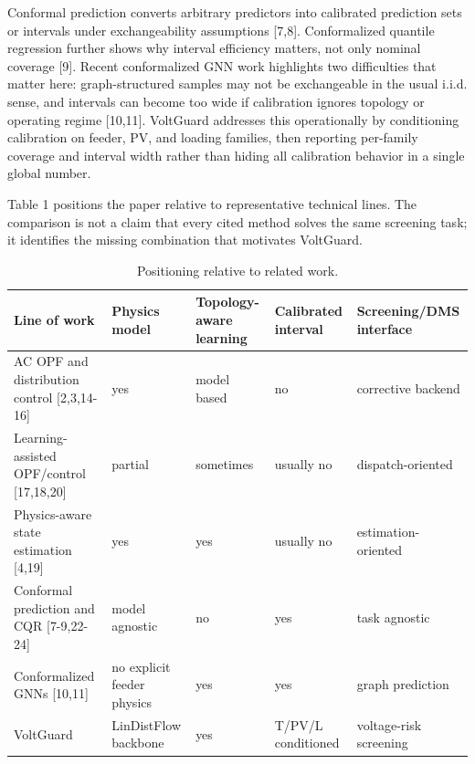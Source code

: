 \documentclass[
  preprint,12pt]{elsarticle}
\begin{document}
Conformal prediction converts arbitrary predictors into calibrated
prediction sets or intervals under exchangeability assumptions
{[}7,8{]}. Conformalized quantile regression further shows why interval
efficiency matters, not only nominal coverage {[}9{]}. Recent
conformalized GNN work highlights two difficulties that matter here:
graph-structured samples may not be exchangeable in the usual i.i.d.
sense, and intervals can become too wide if calibration ignores topology
or operating regime {[}10,11{]}. VoltGuard addresses this operationally
by conditioning calibration on feeder, PV, and loading families, then
reporting per-family coverage and interval width rather than hiding all
calibration behavior in a single global number.

Table 1 positions the paper relative to representative technical lines.
The comparison is not a claim that every cited method solves the same
screening task; it identifies the missing combination that motivates
VoltGuard.

\begin{longtable}[]{@{}
  >{\centering\hyphenpenalty=10000\exhyphenpenalty=10000\arraybackslash}m{}
  >{\centering\hyphenpenalty=10000\exhyphenpenalty=10000\arraybackslash}m{}
  >{\centering\hyphenpenalty=10000\exhyphenpenalty=10000\arraybackslash}m{}
  >{\centering\hyphenpenalty=10000\exhyphenpenalty=10000\arraybackslash}m{}
  >{\centering\hyphenpenalty=10000\exhyphenpenalty=10000\arraybackslash}m{}@{}}
\caption{Positioning relative to related work.}\\\toprule\noalign{}
Line of work & Physics model & Topology-aware learning & Calibrated interval & Screening/DMS interface \\
\midrule\noalign{}
\endhead
\bottomrule\noalign{}
\endlastfoot
AC OPF and distribution control {[}2,3,14-16{]} & yes & model based & no
& corrective backend \\
Learning-assisted OPF/control {[}17,18,20{]} & partial & sometimes &
usually no & dispatch-oriented \\
Physics-aware state estimation {[}4,19{]} & yes & yes & usually no &
estimation-oriented \\
Conformal prediction and CQR {[}7-9,22-24{]} & model agnostic & no & yes
& task agnostic \\
Conformalized GNNs {[}10,11{]} & no explicit feeder physics & yes & yes
& graph prediction \\
VoltGuard & LinDistFlow backbone & yes & T/PV/L conditioned &
voltage-risk screening \\
\end{longtable}
\end{document}
